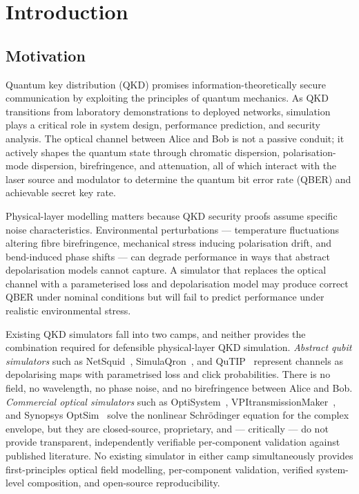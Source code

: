 \documentclass[11pt,a4paper]{article}
\begin{document}
\section{Introduction}

\subsection{Motivation}

Quantum key distribution (QKD) promises information-theoretically secure
communication by exploiting the principles of quantum mechanics.  As QKD
transitions from laboratory demonstrations to deployed networks,
simulation plays a critical role in system design, performance prediction,
and security analysis.  The optical channel between Alice and Bob is not
a passive conduit; it actively shapes the quantum state through chromatic
dispersion, polarisation-mode dispersion, birefringence, and attenuation,
all of which interact with the laser source and modulator to determine
the quantum bit error rate (QBER) and achievable secret key rate.

Physical-layer modelling matters because QKD security proofs assume
specific noise characteristics.  Environmental perturbations --- temperature
fluctuations altering fibre birefringence, mechanical stress inducing
polarisation drift, and bend-induced phase shifts --- can degrade
performance in ways that abstract depolarisation models cannot capture.
A simulator that replaces the optical channel with a parameterised loss
and depolarisation model may produce correct QBER under nominal conditions
but will fail to predict performance under realistic environmental stress.

Existing QKD simulators fall into two camps, and neither provides the
combination required for defensible physical-layer QKD simulation.
\emph{Abstract qubit simulators} such as NetSquid~\cite{netSquid},
SimulaQron~\cite{simulaqron}, and QuTIP~\cite{qutip} represent channels
as depolarising maps with parametrised loss and click probabilities.
There is no field, no wavelength, no phase noise, and no birefringence
between Alice and Bob.  \emph{Commercial optical simulators} such as
OptiSystem~\cite{optisystem}, VPItransmissionMaker~\cite{vpiphotonics},
and Synopsys OptSim~\cite{optsim} solve the nonlinear Schr\"odinger
equation for the complex envelope, but they are closed-source,
proprietary, and --- critically --- do not provide transparent,
independently verifiable per-component validation against published
literature.  No existing simulator in either camp simultaneously
provides first-principles optical field modelling, per-component
validation, verified system-level composition, and open-source
reproducibility.
\end{document}
